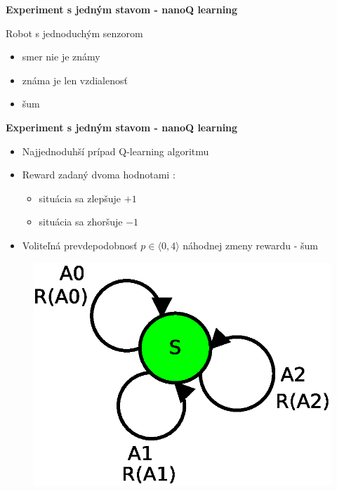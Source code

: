 \documentclass[xcolor=dvipsnames]{beamer}
\begin{document}
\begin{frame}{\bf Experiment s jedným stavom - nanoQ learning}
\begin{minipage}{.5\textwidth}
  \end{minipage}

  Robot s jednoduchým senzorom
  \begin{itemize}
  \item smer nie je známy
  \item známa je len vzdialenosť
  \item šum
  \end{itemize}

\end{frame}





\begin{frame}{\bf Experiment s jedným stavom - nanoQ learning}


  \begin{minipage}{.5\textwidth}

    \begin{itemize}
      \item Najjednoduhší prípad Q-learning algoritmu
      \item Reward zadaný dvoma hodnotami :
              \begin{itemize}
                \item situácia sa zlepšuje $+1$
                \item situácia sa zhoršuje $-1$
              \end{itemize}
      \item Voliteľná prevdepodobnosť $p \in \langle 0, 4 \rangle$ náhodnej zmeny rewardu - šum
    \end{itemize}


  \end{minipage}%
  \begin{minipage}{.5\textwidth}

    \begin{figure}[!htb]
    \centering
    \includegraphics[scale=.5]{../diagrams/single_state.eps}
    \end{figure}


\end{minipage}
\end{frame}
\end{document}
